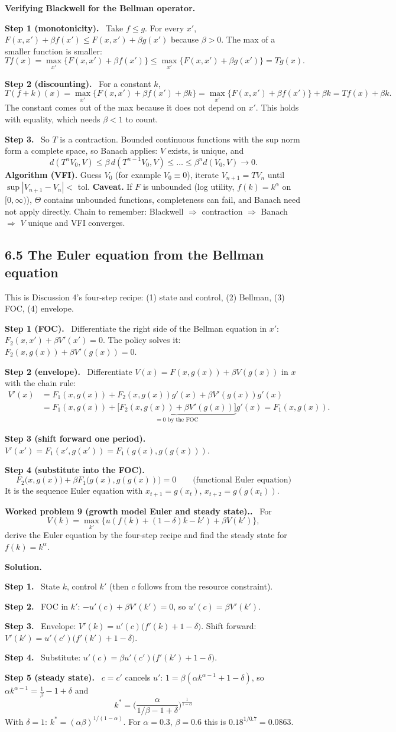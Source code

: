\documentclass[12pt]{article}
\newcommand{\st}[1]{\par\smallskip\textbf{Step #1.}\ }
\newcommand{\ans}[1]{\[\boxed{\ #1\ }\]}
\newcommand{\prob}[1]{\par\bigskip\textbf{Worked problem #1.}\ }
\newcommand{\sol}{\par\smallskip\textbf{Solution.}\par}
\begin{document}
\textbf{Verifying Blackwell for the Bellman operator.}
\st{1 (monotonicity)} Take $f\le g$. For every $x'$, $F(x,x')+\beta f(x')\le F(x,x')+\beta g(x')$ because $\beta>0$. The max of a smaller function is smaller:
\[
Tf(x)=\max_{x'}\{F(x,x')+\beta f(x')\}\le\max_{x'}\{F(x,x')+\beta g(x')\}=Tg(x).
\]
\st{2 (discounting)} For a constant $k$,
\[
T(f+k)(x)=\max_{x'}\{F(x,x')+\beta f(x')+\beta k\}=\max_{x'}\{F(x,x')+\beta f(x')\}+\beta k=Tf(x)+\beta k .
\]
The constant comes out of the max because it does not depend on $x'$. This holds with equality, which needs $\beta<1$ to count.
\st{3} So $T$ is a contraction. Bounded continuous functions with the sup norm form a complete space, so Banach applies: $V$ exists, is unique, and
\[
d(T^nV_0,V)\le\beta\,d(T^{n-1}V_0,V)\le\dots\le\beta^nd(V_0,V)\to0 .
\]
\textbf{Algorithm (VFI).} Guess $V_0$ (for example $V_0\equiv0$), iterate $V_{n+1}=TV_n$ until $\sup|V_{n+1}-V_n|<$ tol.
\textbf{Caveat.} If $F$ is unbounded (log utility, $f(k)=k^\alpha$ on $[0,\infty)$), $\Theta$ contains unbounded functions, completeness can fail, and Banach need not apply directly.
Chain to remember: Blackwell $\Rightarrow$ contraction $\Rightarrow$ Banach $\Rightarrow$ $V$ unique and VFI converges.

\subsection*{6.5 The Euler equation from the Bellman equation}
This is Discussion 4's four-step recipe: (1) state and control, (2) Bellman, (3) FOC, (4) envelope.
\st{1 (FOC)} Differentiate the right side of the Bellman equation in $x'$:
$F_2(x,x')+\beta V'(x')=0$. The policy solves it: $F_2(x,g(x))+\beta V'(g(x))=0$.
\st{2 (envelope)} Differentiate $V(x)=F(x,g(x))+\beta V(g(x))$ in $x$ with the chain rule:
\begin{align*}
V'(x)&=F_1(x,g(x))+F_2(x,g(x))g'(x)+\beta V'(g(x))g'(x)\\
&=F_1(x,g(x))+\underbrace{\big[F_2(x,g(x))+\beta V'(g(x))\big]}_{=0\text{ by the FOC}}g'(x)=F_1(x,g(x)).
\end{align*}
\st{3 (shift forward one period)} $V'(x')=F_1(x',g(x'))=F_1(g(x),g(g(x)))$.
\st{4 (substitute into the FOC)}
\ans{F_2\big(x,g(x)\big)+\beta F_1\big(g(x),g(g(x))\big)=0\qquad\text{(functional Euler equation)}}
It is the sequence Euler equation with $x_{t+1}=g(x_t)$, $x_{t+2}=g(g(x_t))$.

\prob{9 (growth model Euler and steady state).} For
\[
V(k)=\max_{k'}\big\{u(f(k)+(1-\delta)k-k')+\beta V(k')\big\},
\]
derive the Euler equation by the four-step recipe and find the steady state for $f(k)=k^\alpha$.
\sol
\st{1} State $k$, control $k'$ (then $c$ follows from the resource constraint).
\st{2} FOC in $k'$: $-u'(c)+\beta V'(k')=0$, so $u'(c)=\beta V'(k')$.
\st{3} Envelope: $V'(k)=u'(c)\big(f'(k)+1-\delta\big)$. Shift forward: $V'(k')=u'(c')\big(f'(k')+1-\delta\big)$.
\st{4} Substitute: $u'(c)=\beta u'(c')\big(f'(k')+1-\delta\big)$.
\st{5 (steady state)} $c=c'$ cancels $u'$: $1=\beta(\alpha k^{\alpha-1}+1-\delta)$, so
$\alpha k^{\alpha-1}=\frac1\beta-1+\delta$ and
\ans{k^*=\Big(\frac{\alpha}{1/\beta-1+\delta}\Big)^{\frac{1}{1-\alpha}}}
With $\delta=1$: $k^*=(\alpha\beta)^{1/(1-\alpha)}$. For $\alpha=0.3$, $\beta=0.6$ this is $0.18^{1/0.7}=0.0863$.
\end{document}
